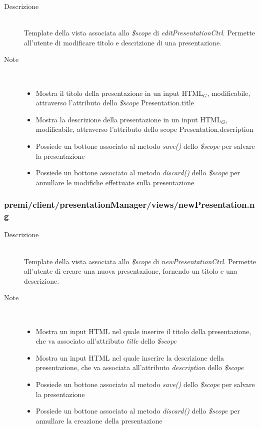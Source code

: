 \begin{description}
\item[Descrizione] \hfill \\
	Template della vista associata allo \textit{\$scope} di \textit{editPresentationCtrl}. Permette all'utente di modificare titolo e descrizione di una presentazione.
\item[Note] \hfill \\
	\begin{itemize}
			\item Mostra il titolo della presentazione in un input HTML$_G$, modificabile, attraverso l'attributo dello \textit{\$scope} Presentation.title
			\item Mostra la descrizione della presentazione in un input HTML$_G$, modificabile, attraverso l'attributo dello scope Presentation.description
			\item Possiede un bottone associato al metodo \textit{save()} dello \textit{\$scope} per salvare la presentazione
			\item Possiede un bottone associato al metodo \textit{discard()} dello \textit{\$scope} per annullare le modifiche effettuate sulla presentazione
	\end{itemize}
\end{description}

\subsubsection{premi/client/presentationManager/views/newPresentation.ng}

\begin{description}
\item[Descrizione] \hfill \\
	Template della vista associata allo \textit{\$scope} di \textit{newPresentationCtrl}. Permette all'utente di creare una nuova presentazione, fornendo un titolo e una descrizione.
\item[Note] \hfill \\
	\begin{itemize}
			\item Mostra un input HTML nel quale inserire il titolo della presentazione, che va associato all'attributo \textit{title} dello \textit{\$scope}
			\item Mostra un input HTML nel quale inserire la descrizione della presentazione, che va associata all'attributo \textit{description} dello \textit{\$scope}
			\item Possiede un bottone associato al metodo \textit{save()} dello \textit{\$scope} per salvare la presentazione
			\item Possiede un bottone associato al metodo \textit{discard()} dello \textit{\$scope} per annullare la creazione della presentazione
	\end{itemize}
\end{description}

